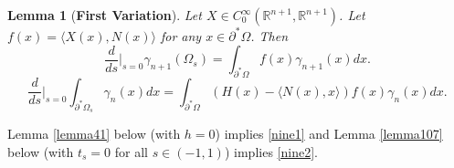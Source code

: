 \documentclass[12pt,reqno]{amsart}
\newtheorem{lemma}[theorem]{Lemma}
\theoremstyle{definition}
\newcommand{\R}{\mathbb{R}}
\newcommand{\embolden}[1]{\textbf {#1}}
\newcommand{\redA}{\partial^{*}\Omega}
\newcommand{\redb}{\partial^{*}}
\newcommand{\sdimn}{n}
\newcommand{\adimn}{n+1}
\begin{document}
\begin{lemma}[\embolden{First Variation}]\label{lemma10}  Let $X\in C_{0}^{\infty}(\R^{\adimn},\R^{\adimn})$.  Let $f(x)=\langle X(x),N(x)\rangle$ for any $x\in\redA$.  Then
\begin{equation}\label{nine1}
\frac{d}{ds}|_{s=0}\gamma_{\adimn}(\Omega_{s})=\int_{\redA}f(x) \gamma_{\adimn}(x)dx.
\end{equation}
\begin{equation}\label{nine2}
\frac{d}{ds}|_{s=0}\int_{\redb \Omega_{s}}\gamma_{\sdimn}(x)dx
=\int_{\redA}(H(x)-\langle N(x),x\rangle)f(x)\gamma_{\sdimn}(x)dx.
\end{equation}
\end{lemma}
 Lemma \ref{lemma41} below (with $h=0$) implies \eqref{nine1} and Lemma \ref{lemma107} below (with $t_{s}=0$ for all $s\in(-1,1)$) implies \eqref{nine2}.
\end{document}
